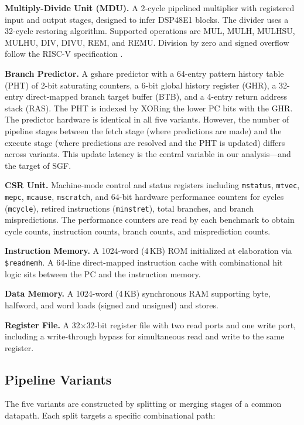 \documentclass[journal]{IEEEtran}
\begin{document}
\begin{table}[t]
\textbf{Multiply-Divide Unit (MDU).} A 2-cycle pipelined multiplier with registered input and output stages, designed to infer DSP48E1 blocks. The divider uses a 32-cycle restoring algorithm. Supported operations are MUL, MULH, MULHSU, MULHU, DIV, DIVU, REM, and REMU. Division by zero and signed overflow follow the RISC-V specification \cite{waterman2019riscv}.

\textbf{Branch Predictor.} A gshare predictor \cite{mcfarling1993combining} with a 64-entry pattern history table (PHT) of 2-bit saturating counters, a 6-bit global history register (GHR), a 32-entry direct-mapped branch target buffer (BTB), and a 4-entry return address stack (RAS). The PHT is indexed by XORing the lower PC bits with the GHR. The predictor hardware is identical in all five variants. However, the number of pipeline stages between the fetch stage (where predictions are made) and the execute stage (where predictions are resolved and the PHT is updated) differs across variants. This update latency is the central variable in our analysis---and the target of SGF.

\textbf{CSR Unit.} Machine-mode control and status registers including \texttt{mstatus}, \texttt{mtvec}, \texttt{mepc}, \texttt{mcause}, \texttt{mscratch}, and 64-bit hardware performance counters for cycles (\texttt{mcycle}), retired instructions (\texttt{minstret}), total branches, and branch mispredictions. The performance counters are read by each benchmark to obtain cycle counts, instruction counts, branch counts, and misprediction counts.

\textbf{Instruction Memory.} A 1024-word (4\,KB) ROM initialized at elaboration via \texttt{\$readmemh}. A 64-line direct-mapped instruction cache with combinational hit logic sits between the PC and the instruction memory.

\textbf{Data Memory.} A 1024-word (4\,KB) synchronous RAM supporting byte, halfword, and word loads (signed and unsigned) and stores.

\textbf{Register File.} A 32$\times$32-bit register file with two read ports and one write port, including a write-through bypass for simultaneous read and write to the same register.

\subsection{Pipeline Variants}

The five variants are constructed by splitting or merging stages of a common datapath. Each split targets a specific combinational path:


\end{table}
\end{document}
